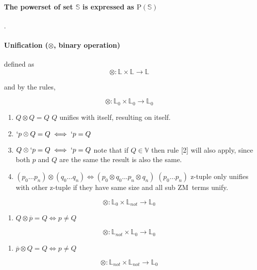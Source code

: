 \documentclass[11pt,a4paper]{report}
\newcommand{\zm}{ZM}
\newcommand{\var}[1]{`#1}
\newcommand{\unify}{\otimes}
\begin{document}
\paragraph{The powerset of set $\mathbb{S}$ is expressed as $\mathrm{P}(\mathbb{S})$}.

\paragraph{Unification ($\unify$, binary operation)} defined as
\[
    \unify: \mathbb{L} \times \mathbb{L} \rightarrow \mathbb{L}
\]

and by the rules,

\[
    \unify: \mathbb{L}_{0} \times \mathbb{L}_{0} \rightarrow \mathbb{L}_{0}
\]

\begin{enumerate}
\item $Q \unify Q = Q$
    \subitem $Q$ unifies with itself, resulting on itself.

\item $\var{p} \unify Q = Q \iff \var{p} = Q$
\item $Q \unify \var{p} = Q \iff \var{p} = Q$
    \subitem note that if $Q \in \mathbb{V}$ then rule [2] will also apply, since both $p$ and $Q$ are the same the result is also the same.

\item $(p_{0} \ldots p_{n}) \unify (q_{0} \ldots q_{n}) \iff (p_{0} \unify q_{0} \ldots p_{n} \unify q_{n})$
    \subitem $(p_{0} \ldots p_{n})$ z-tuple only unifies with other z-tuple if they have same size and all sub \zm\ terms unify.

\end{enumerate}


\[
    \unify: \mathbb{L}_{0} \times \mathbb{L}_{not} \rightarrow \mathbb{L}_{0}
\]

\begin{enumerate}
\item $Q \unify \overline{p} = Q \iff p \neq Q$
\end{enumerate}


\[
    \unify: \mathbb{L}_{not} \times \mathbb{L}_{0} \rightarrow \mathbb{L}_{0}
\]

\begin{enumerate}
\item $\overline{p} \unify Q = Q \iff p \neq Q$
\end{enumerate}

\[
    \unify: \mathbb{L}_{not} \times \mathbb{L}_{not} \rightarrow \mathbb{L}_{0}
\]
\end{document}
